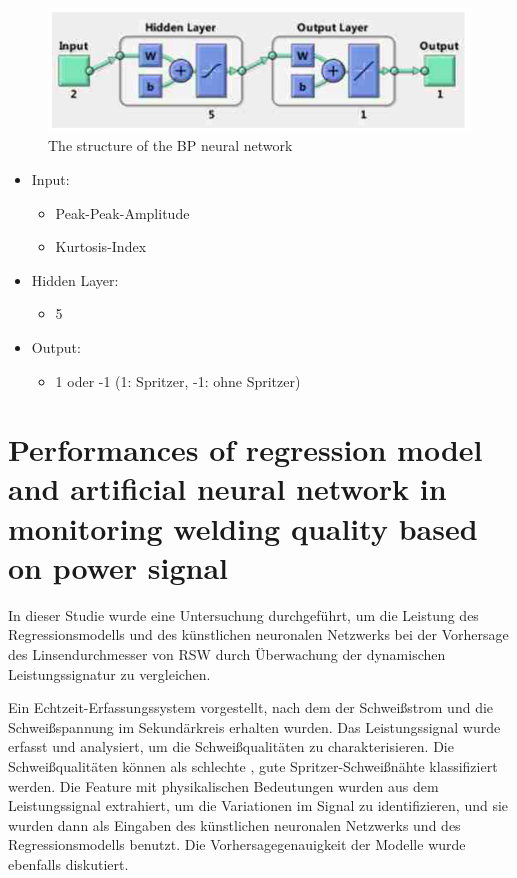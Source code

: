 \documentclass[english,ngerman]{tudscrreprt}
\begin{document}
\begin{figure}[H]
\centering
\includegraphics[scale = 0.8]{./Bilder/The structure of the BP neural network.png}
\caption{The structure of the BP neural network}\label{fgg:Wavelets}
\end{figure}
\begin{itemize}
\item Input:
\begin{itemize}
	\item Peak-Peak-Amplitude 
	\item Kurtosis-Index
\end{itemize}
\item Hidden Layer:
\begin{itemize}
	\item 5
\end{itemize}
\item Output:
\begin{itemize}
	\item 1 oder -1 (1: Spritzer, -1: ohne Spritzer)
\end{itemize}
\end{itemize}
\newpage
\section{Performances of regression model and artificial neural network in monitoring welding quality based on power signal\cite{Zhao.2020}}
In dieser Studie wurde eine Untersuchung durchgeführt, um die Leistung des Regressionsmodells und des künstlichen neuronalen Netzwerks bei der Vorhersage des Linsendurchmesser von RSW durch Überwachung der dynamischen Leistungssignatur zu vergleichen.

Ein Echtzeit-Erfassungssystem vorgestellt, nach dem der Schweißstrom und die Schweißspannung im Sekundärkreis erhalten wurden. Das Leistungssignal wurde erfasst und analysiert, um die Schweißqualitäten zu charakterisieren. Die Schweißqualitäten können als schlechte , gute Spritzer-Schweißnähte klassifiziert werden. Die Feature mit physikalischen Bedeutungen wurden aus dem Leistungssignal extrahiert, um die Variationen im Signal zu identifizieren, und sie wurden dann als Eingaben des künstlichen neuronalen Netzwerks und des Regressionsmodells benutzt. Die Vorhersagegenauigkeit der Modelle wurde ebenfalls diskutiert.


\newpage
\printbibliography[heading=bibintoc]\label{sec:bibliography}%
\end{document}
